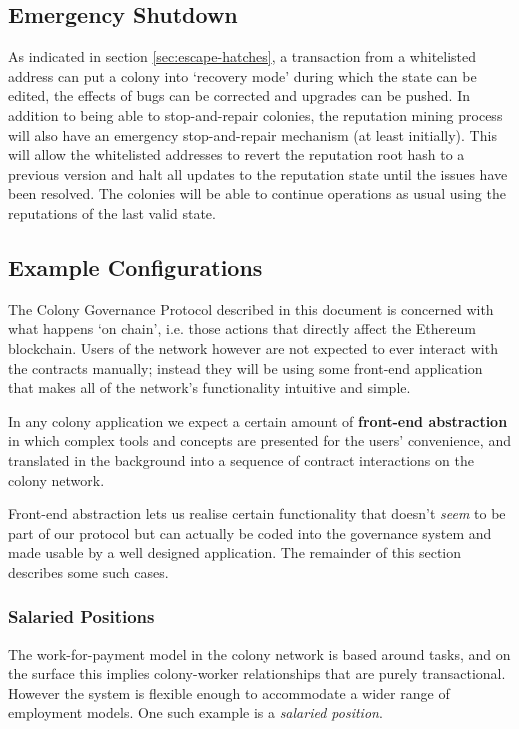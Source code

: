  

\subsection{Emergency Shutdown}\label{sec:big-red-button}
As indicated in section \ref{sec:escape-hatches}, a transaction from a whitelisted address can put a colony into `recovery mode' during which the state can be edited, the effects of bugs can be corrected and upgrades can be pushed. In addition to being able to stop-and-repair colonies, the reputation mining process will also have an emergency stop-and-repair mechanism (at least initially). This will allow the whitelisted addresses to revert the reputation root hash to a previous version and halt all updates to the reputation state until the issues have been resolved. The colonies will be able to continue operations as usual using the reputations of the last valid state.

\subsection{Example Configurations}\label{sec:example-configs}
The Colony Governance Protocol described in this document is concerned with what happens `on chain', i.e. those actions that directly affect the Ethereum blockchain. Users of the network however are not expected to ever interact with the contracts manually; instead they will be using some front-end application that makes all of the network's functionality intuitive and simple.

In any colony application we expect a certain amount of \textbf{front-end abstraction} in which complex tools and concepts are presented for the users' convenience, and translated in the background into a sequence of contract interactions on the colony network.

Front-end abstraction lets us realise certain functionality that doesn't \emph{seem} to be part of our protocol but can actually be coded into the governance system and made usable by a well designed application. The remainder of this section describes some such cases.
%

\subsubsection{Salaried Positions}\label{sec:salary}

The work-for-payment model in the colony network is based around tasks, and on the surface this implies colony-worker relationships that are purely transactional. However the system is flexible enough to accommodate a wider range of employment models. One such example is a \emph{salaried position}.


